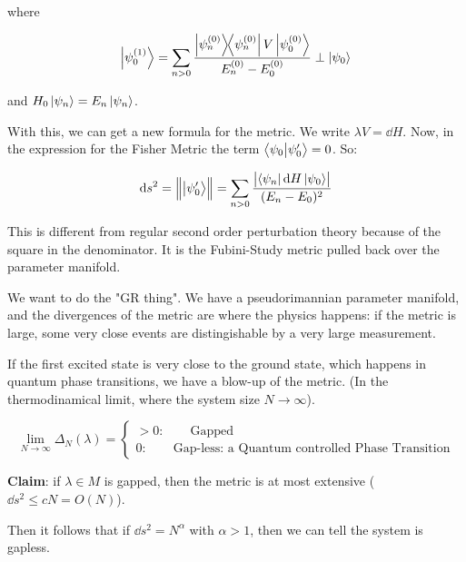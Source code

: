 \documentclass[main.tex]{subfiles}
\begin{document}
where

\begin{equation}
  \ket{\psi_0 ^{(1)} } = \sum _{n>0} \frac{\dyad{\psi_n ^{(0)}} V \ket{\psi_0 ^{(0)} }}{E_n ^{(0)}  -  E_0 ^{(0)} } \perp \ket{\psi_0}
\end{equation}

and \(H_0 \ket{\psi_n} = E_n \ket{\psi_n}\).

With this, we can get a new formula for the metric. We write \(\lambda V = \dd{H} \). Now, in the expression for the Fisher Metric the term  \(\braket{\psi_0}{\psi_0 '} = 0 \). So:

\begin{equation}
  \dd{s^2} = \norm{\ket{\psi_0 '}} = \sum _{n>0}  \frac{\abs{\bra{\psi_n} \dd{H} \ket{\psi_0}} }{(E_n - E_0)^2}
\end{equation}

This is different from regular second order perturbation theory because of the square in the denominator. It is the Fubini-Study metric pulled back over the parameter manifold.

We want to do the "GR thing". We have a pseudorimannian parameter manifold, and the divergences of the metric are where the physics happens: if the metric is large, some very close events are distingishable by a very large measurement.

If the first excited state is very close to the ground state, which happens in quantum phase transitions, we have a blow-up of the metric. (In the thermodinamical limit, where the system size \(N \rightarrow \infty\)).

\begin{equation}
   \lim _ {N \rightarrow \infty} \Delta_N(\lambda) = \begin{cases}
     > 0: \qquad \text{Gapped}  \\
     0: \qquad \text{Gap-less: a Quantum controlled Phase Transition}
 \end{cases}
\end{equation}

\textbf{Claim}: if \(\lambda \in M \) is gapped, then the metric is at most extensive (\(\dd{s^2} \leq cN = O(N) \)).

Then it follows that if \(\dd{s^2} = N^\alpha \) with \(\alpha>1\), then we can tell the system is gapless.
\end{document}
